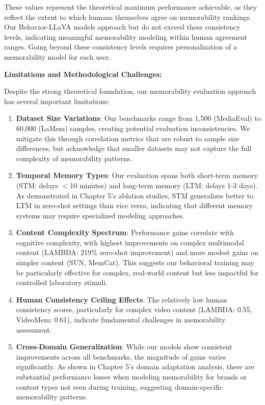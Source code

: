 These values represent the theoretical maximum performance achievable, as they reflect the extent to which humans themselves agree on memorability rankings. Our Behavior-LLaVA models approach but do not exceed these consistency levels, indicating meaningful memorability modeling within human agreement ranges. Going beyond these consistency levels requires personalization of a memorability model for each user.

\textbf{Limitations and Methodological Challenges:}

Despite the strong theoretical foundation, our memorability evaluation approach has several important limitations:

\begin{enumerate}
    \item \textbf{Dataset Size Variations}: Our benchmarks range from 1,500 (MediaEval) to 60,000 (LaMem) samples, creating potential evaluation inconsistencies. We mitigate this through correlation metrics that are robust to sample size differences, but acknowledge that smaller datasets may not capture the full complexity of memorability patterns.
    
    \item \textbf{Temporal Memory Types}: Our evaluation spans both short-term memory (STM: delays $<$10 minutes) and long-term memory (LTM: delays 1-3 days). As demonstrated in Chapter 5's ablation studies, STM generalizes better to LTM in zero-shot settings than vice versa, indicating that different memory systems may require specialized modeling approaches.
    
    \item \textbf{Content Complexity Spectrum}: Performance gains correlate with cognitive complexity, with highest improvements on complex multimodal content (LAMBDA: 219\% zero-shot improvement) and more modest gains on simpler content (SUN, MemCat). This suggests our behavioral training may be particularly effective for complex, real-world content but less impactful for controlled laboratory stimuli.
    
    \item \textbf{Human Consistency Ceiling Effects}: The relatively low human consistency scores, particularly for complex video content (LAMBDA: 0.55, VideoMem: 0.61), indicate fundamental challenges in memorability assessment. 
    
    \item \textbf{Cross-Domain Generalization}: While our models show consistent improvements across all benchmarks, the magnitude of gains varies significantly. As shown in Chapter 5's domain adaptation analysis, there are substantial performance losses when modeling memorability for brands or content types not seen during training, suggesting domain-specific memorability patterns.
\end{enumerate}



